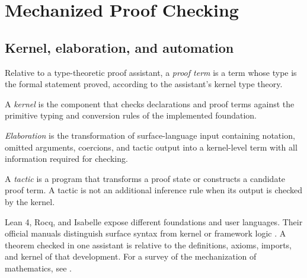 \chapter{Mechanized Proof Checking}
\label{ch:mechanization}

\section{Kernel, elaboration, and automation}
\label{sec:mechanization-01}

\begin{definition}
Relative to a type-theoretic proof assistant, a \emph{proof term} is a term
whose type is the formal statement proved, according to the assistant's kernel
type theory.
\end{definition}

\begin{definition}[Kernel]
A \emph{kernel} is the component that checks declarations and proof terms
against the primitive typing and conversion rules of the implemented
foundation.
\end{definition}

\begin{definition}[Elaboration]
\emph{Elaboration} is the transformation of surface-language input containing
notation, omitted arguments, coercions, and tactic output into a kernel-level
term with all information required for checking.
\end{definition}

\begin{definition}[Tactic]
A \emph{tactic} is a program that transforms a proof state or constructs a
candidate proof term.  A tactic is not an additional inference rule when its
output is checked by the kernel.
\end{definition}

Lean 4, Rocq, and Isabelle expose different foundations and user languages.
Their official manuals distinguish surface syntax from kernel or framework
logic \cite{LeanManual2026,LeanTPIL,DeMouraUllrich2021,RocqManual2026,Isabelle2025}.
A theorem
checked in one assistant is relative to the definitions, axioms, imports, and
kernel of that development.  For a survey of the mechanization of
mathematics, see \cite{Avigad2018}.

